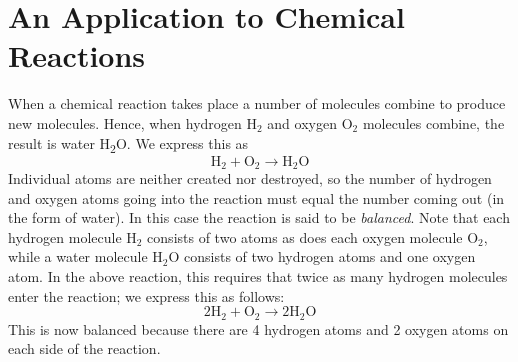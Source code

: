 \section{An Application to Chemical Reactions}
\label{sec:1_6}

When a chemical reaction takes place a number of molecules combine to produce new molecules. Hence, when hydrogen $\mbox{H}_2$ and oxygen $\mbox{O}_2$ molecules combine, the result is water H\textsubscript{2}O. We express this as
\begin{equation*}
\mbox{H}_2 + \mbox{O}_2 \rightarrow \mbox{H}_2\mbox{O}
\end{equation*}
Individual atoms are neither created nor destroyed, so the number of hydrogen and oxygen atoms going into the reaction must equal the number coming out (in the form of water). In 
this case the reaction is said to be \textit{balanced}. Note that each hydrogen molecule $\mbox{H}_2$ consists of two atoms as does each oxygen molecule $\mbox{O}_2$, while a water molecule $\mbox{H}_2\mbox{O}$ consists of two hydrogen atoms and one oxygen atom. In the above reaction, this requires that twice as many hydrogen molecules enter the reaction; we express this as follows:
\begin{equation*}
2\mbox{H}_2 + \mbox{O}_2 \rightarrow 2\mbox{H}_2\mbox{O}
\end{equation*}
This is now balanced because there are 4 hydrogen atoms and 2 oxygen atoms on each side of the reaction.

